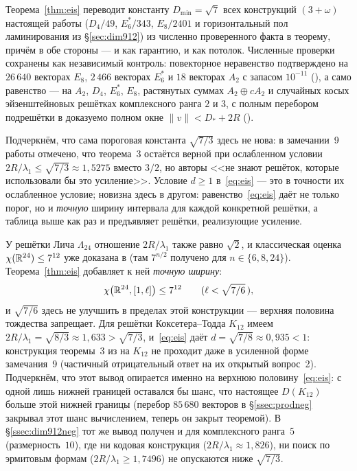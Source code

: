 Теорема~\ref{thm:eis} переводит константу $D_{\min}=\sqrt7$ всех
конструкций $(3+\omega)$ настоящей работы ($D_4/49$, $E_6^*/343$, $E_8/2401$ и
горизонтальный пол ламинирования из \S\ref{sec:dim912}) из численно
проверенного факта в теорему, причём в обе стороны --- и как гарантию, и как
потолок. Численные проверки сохранены как независимый контроль: повекторное
неравенство подтверждено на $26\,640$ векторах $E_8$, $2\,466$ векторах
$E_6^*$ и $18$ векторах $A_2$ с запасом $10^{-11}$
(), а само равенство ---
на $A_2$, $D_4$, $E_6^*$, $E_8$, растянутых суммах $A_2\oplus cA_2$ и случайных
косых эйзенштейновых решётках комплексного ранга $2$ и $3$, с полным перебором
подрешётки в доказуемо полном окне $\|v\|<D_*+2R$
().

Подчеркнём, что сама пороговая константа $\sqrt{7/3}$ здесь не нова: в
замечании~9 работы \cite{ABPR} отмечено, что теорема~3 остаётся верной при
ослабленном условии $2R/\lambda_1\le\sqrt{7/3}\approx1{,}5275$ вместо $3/2$,
но авторы <<не знают решёток, которые использовали бы это усиление>>. Условие
$d\ge1$ в~\eqref{eq:eis} --- это в точности их ослабленное условие; новизна
здесь в другом: равенство~\eqref{eq:eis} даёт не только порог, но и \emph{точную}
ширину интервала для каждой конкретной решётки, а таблица выше как раз и
предъявляет решётки, реализующие усиление.

У решётки Лича $\Lambda_{24}$ отношение $2R/\lambda_1$ также равно $\sqrt2$, и
классическая оценка $\chi(\mathbb{R}^{24})\le7^{12}$ уже доказана в \cite{ABPR}
(там $7^{n/2}$ получено для $n\in\{6,8,24\}$). Теорема~\ref{thm:eis} добавляет
к ней \emph{точную ширину}:
\[
\chi\bigl(\mathbb{R}^{24},[1,\ell]\bigr)\le7^{12}\qquad(\ell<\sqrt{7/6}\,),
\]
и $\sqrt{7/6}$ здесь не улучшить в пределах этой конструкции --- верхняя
половина тождества запрещает. Для решётки Коксетера--Тодда $K_{12}$ имеем
$2R/\lambda_1=\sqrt{8/3}\approx1{,}633>\sqrt{7/3}$, и~\eqref{eq:eis} даёт
$d=\sqrt{7/8}\approx0{,}935<1$: конструкция теоремы~3 из \cite{ABPR} на
$K_{12}$ не проходит даже в усиленной форме замечания~9 (частичный
отрицательный ответ на их открытый вопрос~2). Подчеркнём, что этот вывод
опирается именно на верхнюю половину~\eqref{eq:eis}: с одной лишь нижней
границей оставался бы шанс, что настоящее $D(K_{12})$ больше этой нижней границы
(перебор $85\,680$ векторов в \S\ref{ssec:prodneg} закрывал этот шанс
вычислением, теперь он закрыт теоремой). В \S\ref{ssec:dim912neg} тот же вывод
получен и для комплексного ранга~$5$ (размерность~$10$), где ни кодовая
конструкция ($2R/\lambda_1\approx1{,}826$), ни поиск по эрмитовым формам
($2R/\lambda_1\ge1{,}7496$) не опускаются ниже $\sqrt{7/3}$.

